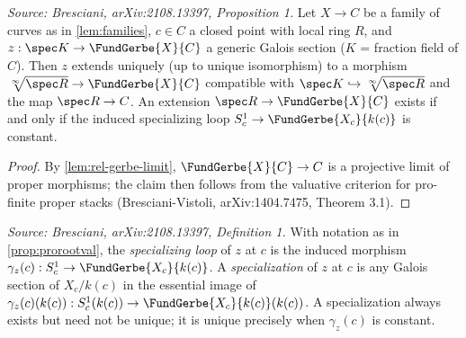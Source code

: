 \begin{proposition}[ProrootValCrit]
  \label{prop:prorootval}
  \textit{Source: Bresciani, arXiv:2108.13397, Proposition 1.}
  Let \(X \to C\) be a family of curves as in \cref{lem:families}, \(c \in C\) a
  closed point with local ring \(R\), and \(z : \spec K \to \FundGerbe{X}{C}\) a
  generic Galois section (\(K\) = fraction field of \(C\)). Then \(z\) extends
  uniquely (up to unique isomorphism) to a morphism \(\sqrt[\infty]{\spec R} \to \FundGerbe{X}{C}\)
  compatible with \(\spec K \hookrightarrow \sqrt[\infty]{\spec R}\) and the map
  \(\spec R \to C\). An extension \(\spec R \to \FundGerbe{X}{C}\) exists if and only
  if the induced specializing loop \(S^1_c \to \FundGerbe{X_c}{k(c)}\) is constant.
\end{proposition}

\begin{proof}
  By \cref{lem:rel-gerbe-limit}, \(\FundGerbe{X}{C} \to C\) is a projective limit of
  proper morphisms; the claim then follows from the valuative criterion for pro-finite
  proper stacks (Bresciani-Vistoli, arXiv:1404.7475, Theorem 3.1).
\end{proof}

\begin{definition}[SpecLoop]
  \label{def:spec-loop}
  \textit{Source: Bresciani, arXiv:2108.13397, Definition 1.}
  With notation as in \cref{prop:prorootval}, the \emph{specializing loop} of \(z\)
  at \(c\) is the induced morphism \(\gamma_z(c) : S^1_c \to \FundGerbe{X_c}{k(c)}\).
  A \emph{specialization} of \(z\) at \(c\) is any Galois section of \(X_c/k(c)\) in
  the essential image of \(\gamma_z(c)(k(c)) : S^1_c(k(c)) \to \FundGerbe{X_c}{k(c)}(k(c))\).
  A specialization always exists but need not be unique; it is unique precisely when
  \(\gamma_z(c)\) is constant.
\end{definition}

